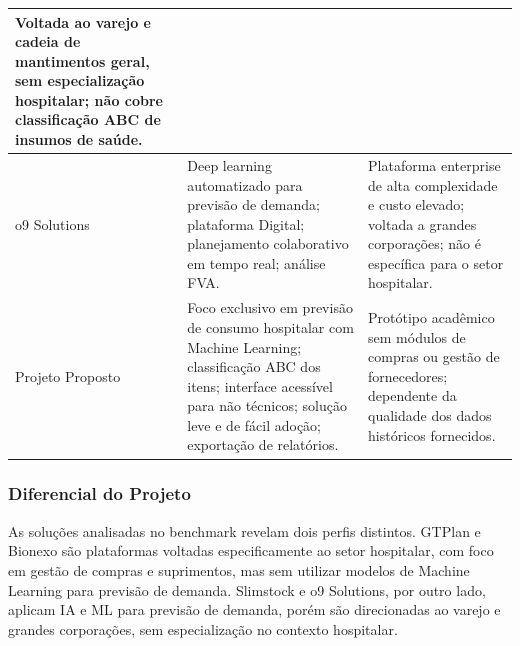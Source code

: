 \documentclass[12pt,a4paper]{article}
\begin{document}
\begin{longtable}{p{} p{} p{}}
    Voltada ao varejo e cadeia de mantimentos geral, sem especialização hospitalar; não cobre classificação ABC de insumos de saúde.                                                                                                                    \\
    \midrule
    o9 Solutions                                                                                                                                                                                         &
    Deep learning automatizado para previsão de demanda; plataforma Digital; planejamento colaborativo em tempo real; análise FVA.                                                                       &
    Plataforma enterprise de alta complexidade e custo elevado; voltada a grandes corporações; não é específica para o setor hospitalar.                                                                                                                \\
    \midrule
    Projeto Proposto                                                                                                                                                                                     &
    Foco exclusivo em previsão de consumo hospitalar com Machine Learning; classificação ABC dos itens; interface acessível para não técnicos; solução leve e de fácil adoção; exportação de relatórios. &
    Protótipo acadêmico sem módulos de compras ou gestão de fornecedores; dependente da qualidade dos dados históricos fornecidos.                                                                                                                      \\
    \bottomrule
\end{longtable}

\subsubsection{Diferencial do Projeto}

As soluções analisadas no benchmark revelam dois perfis distintos. GTPlan e Bionexo são plataformas voltadas especificamente ao setor hospitalar, com foco em gestão de compras e suprimentos, mas sem utilizar modelos de Machine Learning para previsão de demanda. Slimstock e o9 Solutions, por outro lado, aplicam IA e ML para previsão de demanda, porém são direcionadas ao varejo e grandes corporações, sem especialização no contexto hospitalar.

\end{document}
